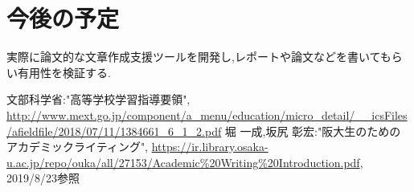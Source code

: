 \documentclass[twocolumn,10pt,a4j]{jsarticle}
\begin{document}
\section{今後の予定}
実際に論文的な文章作成支援ツールを開発し,レポートや論文などを書いてもらい有用性を検証する.

\begin{thebibliography}{99}
 文部科学省:"高等学校学習指導要領",
\url{http://www.mext.go.jp/component/a_menu/education/micro_detail/__icsFiles/afieldfile/2018/07/11/1384661_6_1_2.pdf}
 堀 一成,坂尻 彰宏:"阪大生のためのアカデミックライティング",
\url{https://ir.library.osaka-u.ac.jp/repo/ouka/all/27153/Academic%20Writing%20Introduction.pdf}, 2019/8/23参照


\end{thebibliography}
\end{document}
